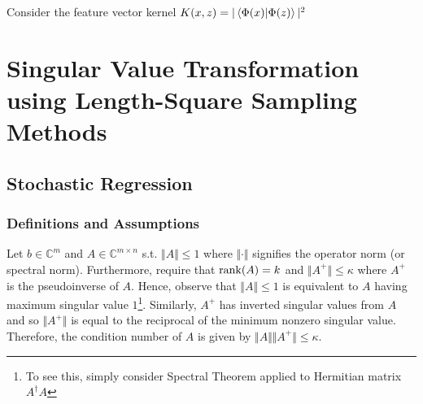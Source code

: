 \documentclass[11pt]{article}
\newcommand\0{\mathbf{0}}
\newcommand\CC{\mathbb{C}}
\newcommand\<{\langle}
\renewcommand\>{\rangle}
\begin{document}
Consider the feature vector kernel $K(x, z) = | \bra{\Phi(x)}\ket{\Phi(z)} |^2$

%
%

\section{Singular Value Transformation using Length-Square Sampling Methods}

\subsection{Stochastic Regression}

\subsubsection{Definitions and Assumptions}

Let $b \in \CC^m$ and $A \in \CC^{m \times n}$ s.t. $\Vert A \Vert \leq 1$ where $\Vert \cdot \Vert$ signifies the operator norm (or spectral norm). Furthermore, require that $\rank(A) = k$ and $\Vert A^+ \Vert \leq \kappa$ where $A^+$ is the pseudoinverse of $A$. Hence, observe that $\Vert A \Vert \leq 1$ is equivalent to $A$ having maximum singular value $1$\footnote{To see this, simply consider Spectral Theorem applied to Hermitian matrix $A^\dag A$}. Similarly, $A^+$ has inverted singular values from $A$ and so $\Vert A^+ \Vert$ is equal to the reciprocal of the minimum nonzero singular value. Therefore, the condition number of $A$ is given by $\Vert A \Vert \Vert A^+ \Vert \leq \kappa$.
\end{document}

